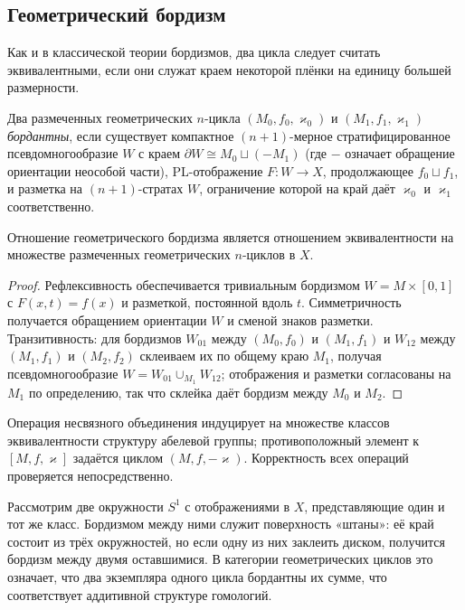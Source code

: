\documentclass[12pt, twoside]{article}
\begin{document}
\subsection{Геометрический бордизм}

Как и в классической теории бордизмов, два цикла следует считать эквивалентными, если они служат краем некоторой плёнки на единицу большей размерности.

\begin{definition}\label{def:bordism}
Два размеченных геометрических $n$-цикла $(M_0,f_0,\varkappa_0)$ и $(M_1,f_1,\varkappa_1)$ \emph{бордантны}, если существует компактное $(n+1)$-мерное стратифицированное псевдомногообразие $W$ с краем $\partial W \cong M_0 \sqcup (-M_1)$ (где $-$ означает обращение ориентации неособой части), PL-отображение $F: W \to X$, продолжающее $f_0 \sqcup f_1$, и разметка на $(n+1)$-стратах $W$, ограничение которой на край даёт $\varkappa_0$ и $\varkappa_1$ соответственно.
\end{definition}

\begin{lemma}
Отношение геометрического бордизма является отношением эквивалентности на множестве размеченных геометрических $n$-циклов в $X$.
\end{lemma}
\begin{proof}
Рефлексивность обеспечивается тривиальным бордизмом $W = M \times [0,1]$ с $F(x,t) = f(x)$ и разметкой, постоянной вдоль $t$. Симметричность получается обращением ориентации $W$ и сменой знаков разметки. Транзитивность: для бордизмов $W_{01}$ между $(M_0,f_0)$ и $(M_1,f_1)$ и $W_{12}$ между $(M_1,f_1)$ и $(M_2,f_2)$ склеиваем их по общему краю $M_1$, получая псевдомногообразие $W = W_{01} \cup_{M_1} W_{12}$; отображения и разметки согласованы на $M_1$ по определению, так что склейка даёт бордизм между $M_0$ и $M_2$.
\end{proof}

Операция несвязного объединения индуцирует на множестве классов эквивалентности структуру абелевой группы; противоположный элемент к $[M,f,\varkappa]$ задаётся циклом $(M,f,-\varkappa)$. Корректность всех операций проверяется непосредственно.

\begin{example}
Рассмотрим две окружности $S^1$ с отображениями в $X$, представляющие один и тот же класс. Бордизмом между ними служит поверхность «штаны»: её край состоит из трёх окружностей, но если одну из них заклеить диском, получится бордизм между двумя оставшимися. В категории геометрических циклов это означает, что два экземпляра одного цикла бордантны их сумме, что соответствует аддитивной структуре гомологий.
\end{example}
\end{document}
